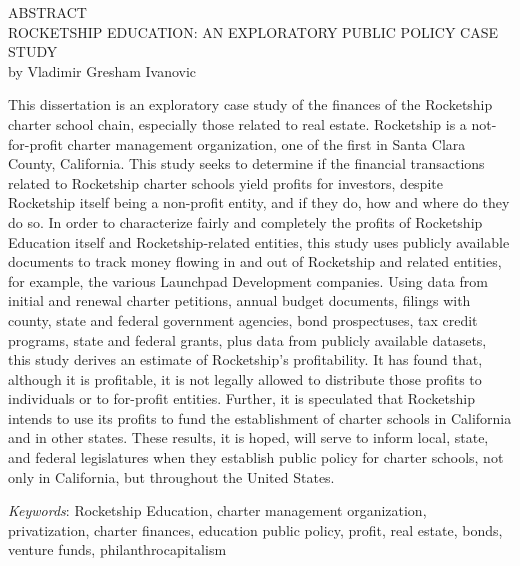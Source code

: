 

\begin{center}
  ABSTRACT\\
  ROCKETSHIP EDUCATION: AN EXPLORATORY PUBLIC POLICY CASE STUDY\\
  by Vladimir Gresham Ivanovic\\
\end{center}\indent
\thispagestyle{empty}
\indent%
This dissertation is an exploratory case study of the finances of the Rocketship charter school chain, especially those related to real estate. Rocketship is a  not-for-profit charter management organization, one of the first in Santa Clara County, California. This study seeks to determine if the financial transactions related to Rocketship charter schools yield profits for investors, despite Rocketship itself being a non-profit entity, and if they do, how and where do they do so. In order to characterize fairly and completely the profits of Rocketship Education itself and Rocketship-related entities, this study uses publicly available documents to track money flowing in and out of Rocketship and related entities, for example, the various Launchpad Development companies. Using data from initial and renewal charter petitions, annual budget documents, filings with county, state and federal government agencies, bond prospectuses, tax credit programs, state and federal grants, plus data from publicly available datasets, this study derives an estimate of Rocketship's profitability. It has found that, although it is profitable, it is not legally allowed to distribute those profits to individuals or to for-profit entities.  Further, it is speculated that Rocketship intends to use its profits to fund the establishment of charter schools in California and in other states. These results, it is hoped, will serve to inform local, state, and federal legislatures when they establish public policy for charter schools, not only in California, but throughout the United States.\bigskip

\noindent\textit{Keywords}: Rocketship Education, charter management organization, privatization, charter finances, education public policy, profit, real estate, bonds, venture funds, philanthrocapitalism

